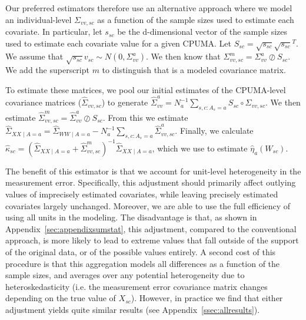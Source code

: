 Our preferred estimators therefore use an alternative approach where we model an individual-level $\Sigma_{vv, sc}$ as a function of the sample sizes used to estimate each covariate. In particular, let $s_{sc}$ be the d-dimensional vector of the sample sizes used to estimate each covariate value for a given CPUMA. Let $S_{sc} = \sqrt{s_{sc}}\sqrt{s_{sc}}^T$. We assume that $\sqrt{s_{sc}}v_{sc} \sim N(0, \Sigma_{vv}^a)$. We then know that $\Sigma_{vv, sc}^m = \Sigma_{vv}^a \oslash S_{sc}$. We add the superscript $m$ to distinguish that is a modeled covariance matrix.

To estimate these matrices, we pool our initial estimates of the CPUMA-level covariance matrices ($\hat{\Sigma}_{vv, sc}$) to generate $\hat{\Sigma}_{vv}^a = N_a^{-1}\sum_{s, c: A_s = a} S_{sc} \circ \Sigma_{vv, sc}$. We then estimate $\hat{\Sigma}_{vv, sc}^m = \hat{\Sigma}_{vv}^a \oslash S_{sc}$. From this we estimate $\hat{\Sigma}_{XX \mid A = a} = \hat{\Sigma}_{WW \mid A = a} - N_a^{-1}\sum_{s, c: A_s = a}\hat{\Sigma}_{vv, sc}^a$. Finally, we calculate $\hat{\kappa}_{sc} = (\hat{\Sigma}_{XX \mid A = a} + \hat{\Sigma}_{vv, sc}^m)^{-1}\hat{\Sigma}_{XX \mid A = a}$, which we use to estimate $\hat{\eta}_a(W_{sc})$. 

The benefit of this estimator is that we account for unit-level heterogeneity in the measurement error. Specifically, this adjustment should primarily affect outlying values of imprecisely estimated covariates, while leaving precisely estimated covariates largely unchanged. Moreover, we are able to use the full efficiency of using all units in the modeling. The disadvantage is that, as shown in Appendix~\ref{sec:appendixsumstat}, this adjustment, compared to the conventional approach, is more likely to lead to extreme values that fall outside of the support of the original data, or of the possible values entirely. A second cost of this procedure is that this aggregation models all differences as a function of the sample sizes, and averages over any potential heterogeneity due to heteroskedasticity (i.e. the measurement error covariance matrix changes depending on the true value of $X_{sc}$). However, in practice we find that either adjustment yields quite similar results (see Appendix~\ref{ssec:allresults}).
